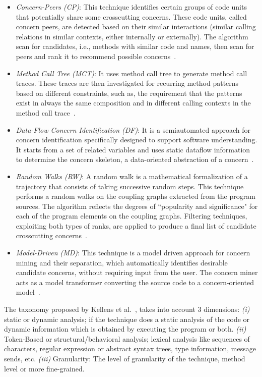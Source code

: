 \begin{itemize}
\item \textit{Concern-Peers (CP)}: This technique identifies certain groups of code units that potentially share some crosscutting concerns. These code units, called concern peers, are detected based on their similar interactions (similar calling relations in similar contexts, either internally or externally). The algorithm scan for candidates, i.e., methods with similar code and names, then scan for peers and rank it to recommend possible concerns~\cite{Nguyen2011}. 

\item \textit{Method Call Tree (MCT)}: It uses method call tree to generate method call traces. These traces are then investigated for recurring method patterns based on different constraints, such as, the requirement that the patterns exist in always the same composition and in different calling contexts in the method call trace~\cite{Qu:2007:AMU:1262690.1262897}.

\item \textit{Data-Flow Concern Identification (DF)}: It is a semiautomated approach for concern identification specifically designed to support software understanding. It starts from a set of related variables and uses static dataflow information to determine the concern skeleton, a data-oriented abstraction of a concern~\cite{Trifu:2008:UDI:1545010.1545363}.

\item \textit{Random Walks (RW)}: A random walk is a mathematical formalization of a trajectory that consists of taking successive random steps. This technique performs a random walks on the coupling graphs extracted from the program sources. The algorithm reflects the degrees of ``popularity and significance" for each of the program elements on the coupling graphs. Filtering techniques, exploiting both types of ranks, are applied to produce a final list of candidate crosscutting concerns~\cite{CharlesZhang2011}.

\item \textit{Model-Driven (MD)}: This technique is a model driven approach for concern mining and their separation, which automatically identifies desirable candidate concerns, without requiring input from the user. The concern miner acts as a model transformer converting the source code to a concern-oriented model~\cite{Nora}.

\end{itemize}

The taxonomy proposed by Kellens et al.~\cite{Kellens}, takes into account 3 dimensions: \textit{(i)} static or dynamic analysis; if the technique does a static analysis of the code or dynamic information which is obtained by executing the program or both. \textit{(ii)} Token-Based or structural/behavioral analysis; lexical analysis like sequences of characters, regular expression or abstract syntax trees, type information, message sends, etc. \textit{(iii)} Granularity: The level of granularity of the technique, method level or more fine-grained. 

